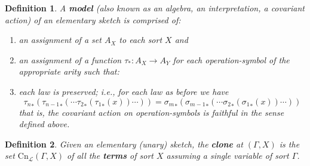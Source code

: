 \documentclass[12pt,twoside]{reedthesis}
\newtheorem{definition}{Definition}
\newtheorem{example}{Example}
\begin{document}
  \begin{definition}
    A \textbf{model} (also known as an algebra, an interpretation, a covariant
    action) of an elementary sketch is comprised of:
    \begin{enumerate}
      \item an assignment of a set $A_X$ to each sort $X$ and
      \item an assignment of a function $\tau_* : A_X \rightarrow A_Y$ for each
            operation-symbol of the appropriate arity such that:
      \item each law is preserved; i.e., for each law as before we have
            \[ {\tau_n}_* ({\tau_{n-1}}_* (\cdots {\tau_2}_* ({\tau_1}_* (x))\cdots )) = {\sigma_m}_* ({\sigma_{m-1}}_*(\cdots {\sigma_2}_* ({\sigma_1}_* (x))\cdots )) \]
            that is, the covariant action on operation-symbols is faithful in
            the sense defined above.
    \end{enumerate}
  \end{definition}


  \begin{definition}
    Given an elementary (unary) sketch, the \textbf{clone} at \( (\Gamma, X) \) is
    the set \( \text{Cn}_\mathcal{L} (\Gamma, X) \) of all the \textbf{terms} of sort
    $X$ assuming a single variable of sort $\Gamma$.
  \end{definition}
\end{document}
